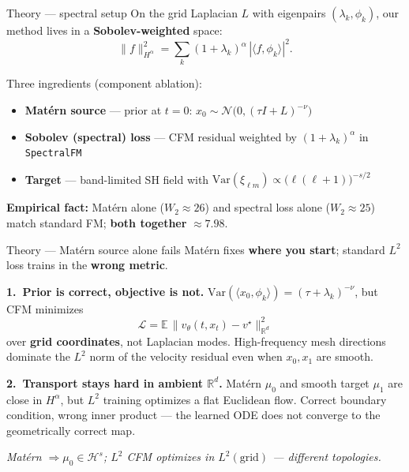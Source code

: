 \documentclass[aspectratio=169,11pt]{beamer}
\begin{document}
\begin{frame}{Theory --- spectral setup}
  \small
  On the grid Laplacian $L$ with eigenpairs $(\lambda_k, \phi_k)$, our method lives in a \textbf{Sobolev-weighted} space:
  \[
    \|f\|_{H^\alpha}^2 = \sum_k (1+\lambda_k)^{\alpha}\, |\langle f, \phi_k\rangle|^2 .
  \]

  \vspace{0.35em}
  Three ingredients (component ablation):
  \begin{itemize}\setlength{\itemsep}{0.15em}
    \item \textbf{Mat\'ern source} --- prior at $t{=}0$: $x_0 \sim \mathcal{N}\bigl(0, (\tau I + L)^{-\nu}\bigr)$
    \item \textbf{Sobolev (spectral) loss} --- CFM residual weighted by $(1+\lambda_k)^{\alpha}$ in \texttt{SpectralFM}
    \item \textbf{Target} --- band-limited SH field with $\mathrm{Var}(\xi_{\ell m}) \propto \bigl(\ell(\ell{+}1)\bigr)^{-s/2}$
  \end{itemize}

  \vspace{0.35em}
  \textbf{Empirical fact:} Mat\'ern alone ($W_2 \approx 26$) and spectral loss alone ($W_2 \approx 25$) match standard FM; \textbf{both together} $\approx 7.98$.
\end{frame}

\begin{frame}{Theory --- Mat\'ern source alone fails}
  \small
  Mat\'ern fixes \textbf{where you start}; standard $L^2$ loss trains in the \textbf{wrong metric}.

  \vspace{0.35em}
  \textbf{1.\ Prior is correct, objective is not.}\quad
  $\mathrm{Var}(\langle x_0, \phi_k\rangle) = (\tau + \lambda_k)^{-\nu}$, but CFM minimizes
  \[
    \mathcal{L} = \mathbb{E}\,\|v_\theta(t, x_t) - v^\star\|_{\mathbb{R}^d}^2
  \]
  over \textbf{grid coordinates}, not Laplacian modes. High-frequency mesh directions dominate the $L^2$ norm of the velocity residual even when $x_0, x_1$ are smooth.

  \vspace{0.35em}
  \textbf{2.\ Transport stays hard in ambient $\mathbb{R}^d$.}\quad
  Mat\'ern $\mu_0$ and smooth target $\mu_1$ are close in $H^\alpha$, but $L^2$ training optimizes a flat Euclidean flow. Correct boundary condition, wrong inner product --- the learned ODE does not converge to the geometrically correct map.

  \vspace{0.25em}
  \textit{Mat\'ern $\Rightarrow \mu_0 \in \mathcal{H}^s$; $L^2$ CFM optimizes in $L^2(\text{grid})$ --- different topologies.}
\end{frame}
\end{document}
